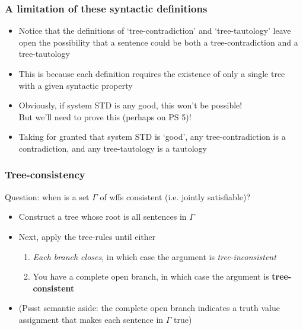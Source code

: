 \begin{frame}
\frametitle{A limitation of these syntactic definitions}

\begin{itemize}[<+->]

\item Notice that the definitions of `tree-contradiction' and `tree-tautology' leave open the possibility that a sentence could be both a tree-contradiction and a tree-tautology

\item This is because each definition requires the existence of only a single tree with a given syntactic property

\item Obviously, if system STD is any good, this won't be possible! \\ But we'll need to prove this (perhaps on PS 5)!

\item Taking for granted that system STD is `good', any tree-contradiction is a contradiction, and any tree-tautology is a tautology

\end{itemize}
\end{frame}

\begin{frame}
\frametitle{Tree-consistency}

Question: when is a set $\Gamma$ of wffs consistent (i.e. jointly satisfiable)?

\begin{itemize}[<+->]

\item Construct a tree whose root is all sentences in $\Gamma$ 

\item Next, apply the tree-rules until either

\bigskip

\begin{enumerate}[1.)]

\item \emph{Each branch closes}, in which case the argument is \emph{tree-inconsistent}


\bigskip

\item You have \textcolor{OGlyallpink}{a complete open branch}, in which case the argument is \textcolor{OGlyallpink}{\textbf{tree-consistent}}


\end{enumerate}

\bigskip 

\item (Pssst semantic aside: the complete open branch indicates a truth value assignment that makes each sentence in $\Gamma$ true)

\end{itemize}
\end{frame}


